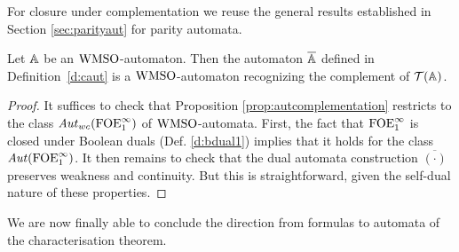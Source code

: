 For closure under complementation we reuse the general results established in Section \ref{sec:parityaut} for parity automata.

\begin{lemma}
\label{t:cl-cmp}
Let $\mathbb{A}$ be an $\mathrm{WMSO}$-automaton.
Then the automaton $\overline{\mathbb{A}}$ defined in Definition~\ref{d:caut} is a
$\mathrm{WMSO}$-automaton recognizing the complement of $\mathcal{T}(\mathbb{A})$.
\end{lemma}

\begin{proof} It suffices to check that Proposition \ref{prop:autcomplementation} restricts to the class $\mathit{Aut}_{wc}(\mathrm{FOE}^{\infty}_1)$ of $\mathrm{WMSO}$-automata. First, the fact that $\mathrm{FOE}^{\infty}_1$ is closed under Boolean duals (Def. \ref{d:bdual1}) implies that it holds for the class $\mathit{Aut}(\mathrm{FOE}^{\infty}_1)$. It then remains to check that the dual automata construction $\overline{(\cdot)}$ preserves weakness and continuity. But this is straightforward, given the self-dual nature of these properties.\end{proof}



We are now finally able to conclude the direction from formulas to automata of the characterisation theorem.

